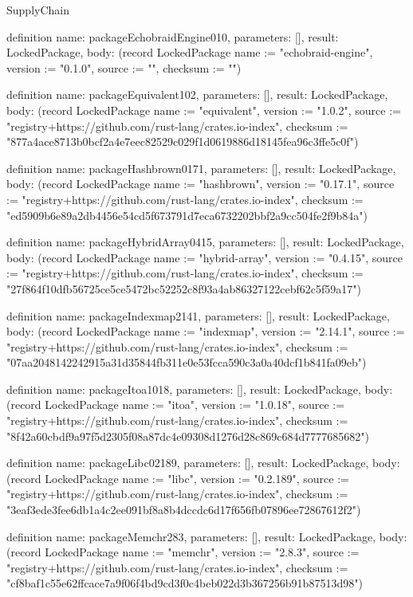 \begin{lexlean}{SupplyChain}
\begin{semanticmodule}
definition{
  name: packageEchobraidEngine010,
  parameters: [],
  result: LockedPackage,
  body: (record LockedPackage {name := "echobraid-engine", version := "0.1.0", source := "", checksum := ""})
}

definition{
  name: packageEquivalent102,
  parameters: [],
  result: LockedPackage,
  body: (record LockedPackage {name := "equivalent", version := "1.0.2", source := "registry+https://github.com/rust-lang/crates.io-index", checksum := "877a4ace8713b0bcf2a4e7eec82529c029f1d0619886d18145fea96c3ffe5c0f"})
}

definition{
  name: packageHashbrown0171,
  parameters: [],
  result: LockedPackage,
  body: (record LockedPackage {name := "hashbrown", version := "0.17.1", source := "registry+https://github.com/rust-lang/crates.io-index", checksum := "ed5909b6e89a2db4456e54cd5f673791d7eca6732202bbf2a9cc504fe2f9b84a"})
}

definition{
  name: packageHybridArray0415,
  parameters: [],
  result: LockedPackage,
  body: (record LockedPackage {name := "hybrid-array", version := "0.4.15", source := "registry+https://github.com/rust-lang/crates.io-index", checksum := "27f864f10dfb56725ce5ce5472bc52252c8f93a4ab86327122cebf62c5f59a17"})
}

definition{
  name: packageIndexmap2141,
  parameters: [],
  result: LockedPackage,
  body: (record LockedPackage {name := "indexmap", version := "2.14.1", source := "registry+https://github.com/rust-lang/crates.io-index", checksum := "07aa2048142242915a31d35844fb311e0e53fcca590c3a0a40dcf1b841fa09eb"})
}

definition{
  name: packageItoa1018,
  parameters: [],
  result: LockedPackage,
  body: (record LockedPackage {name := "itoa", version := "1.0.18", source := "registry+https://github.com/rust-lang/crates.io-index", checksum := "8f42a60cbdf9a97f5d2305f08a87dc4e09308d1276d28c869c684d7777685682"})
}

definition{
  name: packageLibc02189,
  parameters: [],
  result: LockedPackage,
  body: (record LockedPackage {name := "libc", version := "0.2.189", source := "registry+https://github.com/rust-lang/crates.io-index", checksum := "3eaf3ede3fee6db1a4c2ee091bf8a8b4dccdc6d17f656fb07896ee72867612f2"})
}

definition{
  name: packageMemchr283,
  parameters: [],
  result: LockedPackage,
  body: (record LockedPackage {name := "memchr", version := "2.8.3", source := "registry+https://github.com/rust-lang/crates.io-index", checksum := "cf8baf1c55e62ffcace7a9f06f4bd9cd3f0c4beb022d3b367256b91b87513d98"})
}


\end{semanticmodule}
\end{lexlean}
